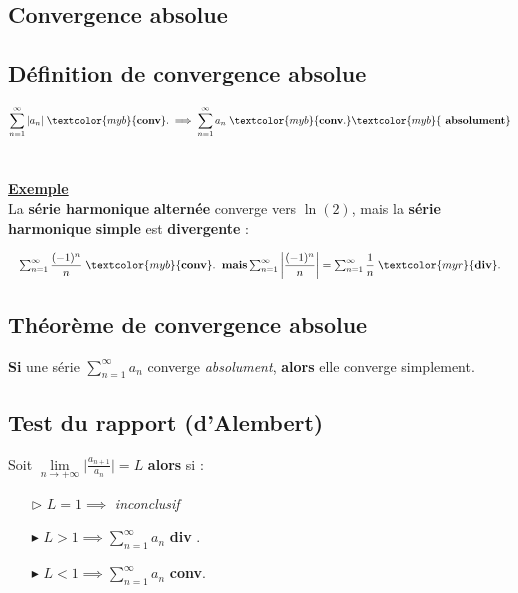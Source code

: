\documentclass{report}
\begin{document}
\begin{multicols*}{3}
\chapter{Convergence absolue}
    \section{Définition de convergence absolue}
    \vspace{-2em}
     \[%
        \sum_{n=1}^{\infty }|a_n| \; \textcolor{myb}{\textbf{conv}}.  \implies 
        \sum_{n=1}^{\infty }a_n \; \textcolor{myb}{\textbf{conv}.} 
        \textcolor{myb}{\textbf{ absolument}}  
     \]%
    \\
     
    \vspace{1em}
    \noindent 
    \underline{\textbf{Exemple}} 
    \vspace{1em}\\
    La \textbf{série harmonique} \textcolor{myb}{\textbf{alternée}} converge 
    vers $\ln(2)$, mais la \textbf{série harmonique} 
    \textcolor{myr}{\textbf{simple}} est \textcolor{myr}{\textbf{divergente}} :  


    \noindent 
    \begin{align*}
    \resizebox{1\linewidth}{!}{$
    \sum_{n=1}^{\infty }\dfrac{(-1)^n}{n} \; 
    \textcolor{myb}{\textbf{conv}}. \;\;  \textbf{mais} 
          \sum_{n=1}^{\infty }\left|\dfrac{(-1)^n}{n} \right| = 
          \sum_{n=1}^{\infty }\dfrac{1}{n} \;
          \textcolor{myr}{\textbf{div}}.  
    $}          
    \end{align*}
    \section{Théorème de convergence absolue}
    \textbf{Si} une série $\sum_{n=1}^{\infty }a_n$ converge \textit{absolument}, 
       \textbf{alors} elle converge simplement.  


    \section{Test du rapport (d'Alembert)}
    Soit $\lim\limits_{n \to+\infty } \Big|\frac{a_{n+1}}{a_n}  \Big| = L$ 
    \textbf{alors} si :   
    \begin{itemize}
    \item [$\rhd$ ] $L = 1 \implies$ \textit{ inconclusif}  
    \item [$\blacktriangleright$ ] $L > 1 \implies \sum_{n=1}^{\infty } a_n$ 
      \textcolor{myr}{\textbf{div}} .   
    \item [$\blacktriangleright$ ] $L < 1 \implies \sum_{n=1}^{\infty } a_n$ 
    \textcolor{myb}{\textbf{conv}}. 
    \end{itemize}



\end{multicols*}
\end{document}

